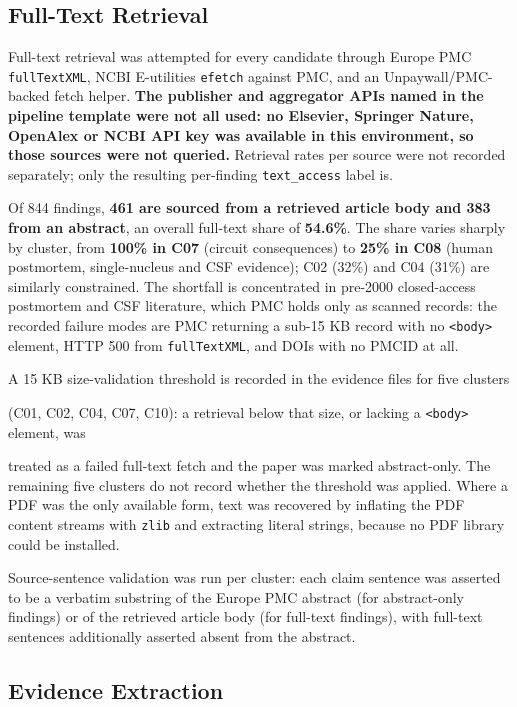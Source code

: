 \documentclass[11pt]{article}
\begin{document}
\subsection{Full-Text Retrieval}
\label{sec-methods-retrieval}

Full-text retrieval was attempted for every candidate through Europe PMC \texttt{fullTextXML}, NCBI E-utilities \texttt{efetch} against PMC, and an Unpaywall/PMC-backed fetch helper. \textbf{The publisher and aggregator APIs named in the pipeline template were not all used: no Elsevier, Springer Nature, OpenAlex or NCBI API key was available in this environment, so those sources were not queried.} Retrieval rates per source were not recorded separately; only the resulting per-finding \texttt{text\_access} label is.

Of 844 findings, \textbf{461 are sourced from a retrieved article body and 383 from an abstract}, an overall full-text share of \textbf{54.6\%}. The share varies sharply by cluster, from \textbf{100\% in C07} (circuit consequences) to \textbf{25\% in C08} (human postmortem, single-nucleus and CSF evidence); C02 (32\%) and C04 (31\%) are similarly constrained. The shortfall is concentrated in pre-2000 closed-access postmortem and CSF literature, which PMC holds only as scanned records: the recorded failure modes are PMC returning a sub-15 KB record with no \texttt{<body>} element, HTTP 500 from \texttt{fullTextXML}, and DOIs with no PMCID at all.

A 15 KB size-validation threshold is recorded in the evidence files for five clusters

(C01, C02, C04, C07, C10): a retrieval below that size, or lacking a \texttt{<body>} element, was

treated as a failed full-text fetch and the paper was marked abstract-only. The remaining five clusters do not record whether the threshold was applied. Where a PDF was the only available form, text was recovered by inflating the PDF content streams with \texttt{zlib} and extracting literal strings, because no PDF library could be installed.

Source-sentence validation was run per cluster: each claim sentence was asserted to be a verbatim substring of the Europe PMC abstract (for abstract-only findings) or of the retrieved article body (for full-text findings), with full-text sentences additionally asserted absent from the abstract.

\subsection{Evidence Extraction}
\label{sec-methods-extraction}
\end{document}
